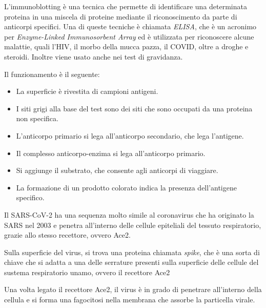 L'immunoblotting è una tecnica che permette di identificare una determinata proteina in una miscela di proteine mediante il riconoscimento da parte di anticorpi specifici. Una di queste tecniche è chiamata \emph{ELISA}, che è un acronimo per \emph{Enzyme-Linked Immunosorbent Array} ed è utilizzata per riconoscere alcune malattie, quali l'HIV, il morbo della mucca pazza, il COVID, oltre a droghe e steroidi. Inoltre viene usato anche nei test di gravidanza.


Il funzionamento è il seguente:
\begin{itemize}
\item La superficie è rivestita di campioni antigeni.
\item I siti grigi alla base del test sono dei siti che sono occupati da una proteina non specifica.
\item L'anticorpo primario si lega all'anticorpo secondario, che lega l'antigene.
\item Il complesso anticorpo-enzima si lega all'anticorpo primario.
\item Si aggiunge il substrato, che consente agli anticorpi di viaggiare.
\item La formazione di un prodotto colorato indica la presenza dell'antigene specifico.
\end{itemize}


Il SARS-CoV-2 ha una sequenza molto simile al coronavirus che ha originato la SARS nel 2003 e penetra all'interno delle cellule epiteliali del tessuto respiratorio, grazie allo stesso recettore, ovvero Ace2.

Sulla superficie del virus, si trova una proteina chiamata \emph{spike}, che è una sorta di chiave che si adatta a una delle serrature presenti sulla superficie delle cellule del sustema respiratorio unamo, ovvero il recettore Ace2


Una volta legato il recettore Ace2, il virus è in grado di penetrare all'interno della cellula e si forma una fagocitosi nella membrana che assorbe la particella virale.